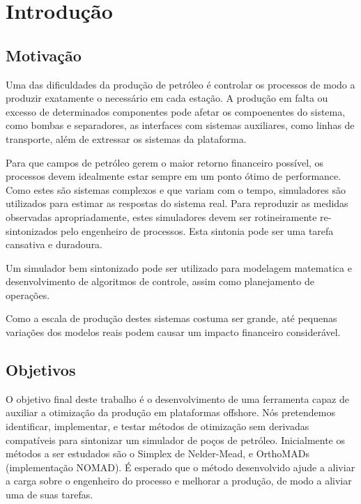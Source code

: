 

\chapter{Introdução} \label{chap:1}



\section{Motivação}

Uma das dificuldades da produção de petróleo é controlar os processos de modo a produzir exatamente o necessário em cada estação. A produção em falta ou excesso de determinados componentes pode afetar os compoenentes do sistema, como bombas e separadores, as interfaces com sistemas auxiliares, como linhas de transporte, além de extressar os sistemas da plataforma.

  Para que campos de petróleo gerem o maior retorno financeiro possível, os processos devem idealmente estar sempre em um ponto ótimo de performance. Como estes são sistemas complexos e que variam com o tempo, simuladores são utilizados para estimar as respostas do sistema real. Para reproduzir as medidas observadas apropriadamente, estes simuladores devem ser rotineiramente re-sintonizados pelo engenheiro de processos. Esta sintonia pode ser uma tarefa cansativa e duradoura.
  
Um simulador bem sintonizado pode ser utilizado para modelagem matematica e desenvolvimento de  algoritmos de controle, assim como planejamento de operações.

Como a escala de produção destes sistemas costuma ser grande, até pequenas variações dos modelos reais podem causar um impacto financeiro considerável.


\section{Objetivos}

O objetivo final deste trabalho é o desenvolvimento de uma ferramenta capaz de auxiliar a otimização da produção em plataformas offshore. Nós pretendemos identificar, implementar, e testar métodos de otimização sem derivadas compatíveis para sintonizar um simulador de poços de petróleo.
Inicialmente os métodos a ser estudados são o Simplex de Nelder-Mead, e OrthoMADs (implementação NOMAD).
É esperado que o método desenvolvido ajude a aliviar a carga sobre o engenheiro do processo e melhorar a produção, de modo a aliviar uma de suas tarefas.

